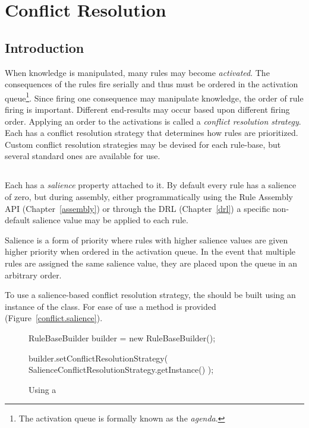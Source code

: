 \chapter{Conflict Resolution}
\label{conflict}

\section{Introduction}

When knowledge is manipulated, many rules may become \emph{activated}.
The consequences of the rules fire serially and thus must be ordered
in the activation queue\footnote{The activation queue is formally
known as the \emph{agenda}.}.  Since firing one consequence may
manipulate knowledge, the order of rule firing is important. Different
end-results may occur based upon different firing order. Applying an 
order to the activations is called a \emph{conflict resolution
strategy}. Each  has a conflict resolution strategy that
determines how rules are prioritized.
Custom conflict resolution strategies may be devised for each
rule-base, but several standard ones are available for use.

\section{}

Each  has a \emph{salience} property attached
to it.  By default every rule has a salience of zero, but during
assembly, either programmatically using the Rule Assembly API
(Chapter~\vref{assembly}) or through the DRL (Chapter~\vref{drl})
a specific non-default salience value may be applied to each rule.

Salience is a form of priority where rules with higher salience
values are given higher priority when ordered in the activation
queue.  In the event that multiple rules are assigned the same
salience value, they are placed upon the queue in an arbitrary
order.

To use a salience-based conflict resolution strategy, the
 should be built using an instance of
the  class.
For ease of use a
method is provided (Figure~\vref{conflict.salience}).

\begin{figure}
\begin{javaCodelisting}
RuleBaseBuilder builder = new RuleBaseBuilder();

builder.setConflictResolutionStrategy(
                            SalienceConflictResolutionStrategy.getInstance() );
\end{javaCodelisting}
\caption{Using a }
\label{conflict.salience}
\end{figure}

